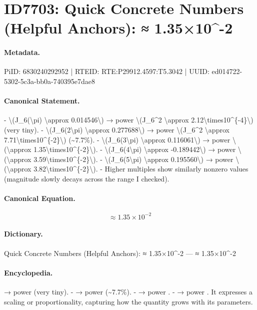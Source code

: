 \section*{ID7703: Quick Concrete Numbers (Helpful Anchors): ≈ 1.35×10\textasciicircum{}-2}
\paragraph{Metadata.}
PiID: 6830240292952 | RTEID: RTE:P29912.4597:T5.3042 | UUID: ed014722-5302-5c3a-bb0a-740395e7dae8

\paragraph{Canonical Statement.}
- \textbackslash{}(J\_6(\textbackslash{}pi) \textbackslash{}approx 0.014546\textbackslash{}) → power \textbackslash{}(J\_6\textasciicircum{}2 \textbackslash{}approx 2.12\textbackslash{}times10\textasciicircum{}\{-4\}\textbackslash{}) (very tiny). - \textbackslash{}(J\_6(2\textbackslash{}pi) \textbackslash{}approx 0.277688\textbackslash{}) → power \textbackslash{}(J\_6\textasciicircum{}2 \textbackslash{}approx 7.71\textbackslash{}times10\textasciicircum{}\{-2\}\textbackslash{}) (\textasciitilde{}7.7\%). - \textbackslash{}(J\_6(3\textbackslash{}pi) \textbackslash{}approx 0.116061\textbackslash{}) → power \textbackslash{}(\textbackslash{}approx 1.35\textbackslash{}times10\textasciicircum{}\{-2\}\textbackslash{}). - \textbackslash{}(J\_6(4\textbackslash{}pi) \textbackslash{}approx -0.189442\textbackslash{}) → power \textbackslash{}(\textbackslash{}approx 3.59\textbackslash{}times10\textasciicircum{}\{-2\}\textbackslash{}). - \textbackslash{}(J\_6(5\textbackslash{}pi) \textbackslash{}approx 0.195560\textbackslash{}) → power \textbackslash{}(\textbackslash{}approx 3.82\textbackslash{}times10\textasciicircum{}\{-2\}\textbackslash{}). - Higher multiples show similarly nonzero values (magnitude slowly decays across the range I checked).

\paragraph{Canonical Equation.}
\[
\approx 1.35\times10^{-2}
\]

\paragraph{Dictionary.}
Quick Concrete Numbers (Helpful Anchors): ≈ 1.35×10\textasciicircum{}-2 — ≈ 1.35×10\textasciicircum{}-2

\paragraph{Encyclopedia.}
→ power (very tiny). - → power (\textasciitilde{}7.7\%). - → power . - → power . It expresses a scaling or proportionality, capturing how the quantity grows with its parameters.
